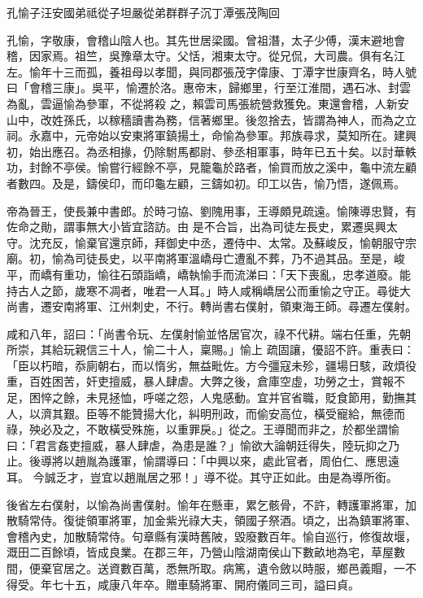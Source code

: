 
\begin{pinyinscope}

 孔愉子汪安國弟祗從子坦嚴從弟群群子沉丁潭張茂陶回



 孔愉，字敬康，會稽山陰人也。其先世居梁國。曾祖潛，太子少傅，漢末避地會稽，因家焉。祖竺，吳豫章太守。父恬，湘東太守。從兄侃，大司農。俱有名江左。愉年十三而孤，養祖母以孝聞，與同郡張茂字偉康、丁潭字世康齊名，時人號曰「會稽三康」。吳平，愉遷於洛。惠帝末，歸鄉里，行至江淮間，遇石冰、封雲為亂，雲逼愉為參軍，不從將殺
 之，賴雲司馬張統營救獲免。東還會稽，人新安山中，改姓孫氏，以稼穡讀書為務，信著鄉里。後忽捨去，皆謂為神人，而為之立祠。永嘉中，元帝始以安東將軍鎮揚土，命愉為參軍。邦族尋求，莫知所在。建興初，始出應召。為丞相掾，仍除駙馬都尉、參丞相軍事，時年已五十矣。以討華軼功，封餘不亭侯。愉嘗行經餘不亭，見籠龜於路者，愉買而放之溪中，龜中流左顧者數四。及是，鑄侯印，而印龜左顧，三鑄如初。印工以告，愉乃悟，遂佩焉。



 帝為晉王，使長兼中書郎。於時刁協、劉隗用事，王導頗見疏遠。愉陳導忠賢，有佐命之勛，謂事無大小皆宜諮訪。由
 是不合旨，出為司徒左長史，累遷吳興太守。沈充反，愉棄官還京師，拜御史中丞，遷侍中、太常。及蘇峻反，愉朝服守宗廟。初，愉為司徒長史，以平南將軍溫嶠母亡遭亂不葬，乃不過其品。至是，峻平，而嶠有重功，愉往石頭詣嶠，嶠執愉手而流涕曰：「天下喪亂，忠孝道廢。能持古人之節，歲寒不凋者，唯君一人耳。」時人咸稱嶠居公而重愉之守正。尋徙大尚書，遷安南將軍、江州刺史，不行。轉尚書右僕射，領東海王師。尋遷左僕射。



 咸和八年，詔曰：「尚書令玩、左僕射愉並恪居官次，祿不代耕。端右任重，先朝所崇，其給玩親信三十人，愉二十人，稟賜。」愉上
 疏固讓，優詔不許。重表曰：「臣以朽暗，忝廁朝右，而以惰劣，無益毗佐。方今彊寇未殄，疆場日駭，政煩役重，百姓困苦，奸吏擅威，暴人肆虐。大弊之後，倉庫空虛，功勞之士，賞報不足，困悴之餘，未見拯恤，呼嗟之怨，人鬼感動。宜并官省職，貶食節用，勤撫其人，以濟其艱。臣等不能贊揚大化，糾明刑政，而偷安高位，橫受寵給，無德而祿，殃必及之，不敢橫受殊施，以重罪戾。」從之。王導聞而非之，於都坐謂愉曰：「君言姦吏擅威，暴人肆虐，為患是誰？」愉欲大論朝廷得失，陸玩抑之乃止。後導將以趙胤為護軍，愉謂導曰：「中興以來，處此官者，周伯仁、應思遠耳。
 今誠乏才，豈宜以趙胤居之邪！」導不從。其守正如此。由是為導所銜。



 後省左右僕射，以愉為尚書僕射。愉年在懸車，累乞骸骨，不許，轉護軍將軍，加散騎常侍。復徙領軍將軍，加金紫光祿大夫，領國子祭酒。頃之，出為鎮軍將軍、會稽內史，加散騎常侍。句章縣有漢時舊陂，毀廢數百年。愉自巡行，修復故堰，溉田二百餘頃，皆成良業。在郡三年，乃營山陰湖南侯山下數畝地為宅，草屋數間，便棄官居之。送資數百萬，悉無所取。病篤，遺令斂以時服，鄉邑義賵，一不得受。年七十五，咸康八年卒。贈車騎將軍、開府儀同三司，謚曰貞。




\end{pinyinscope}
